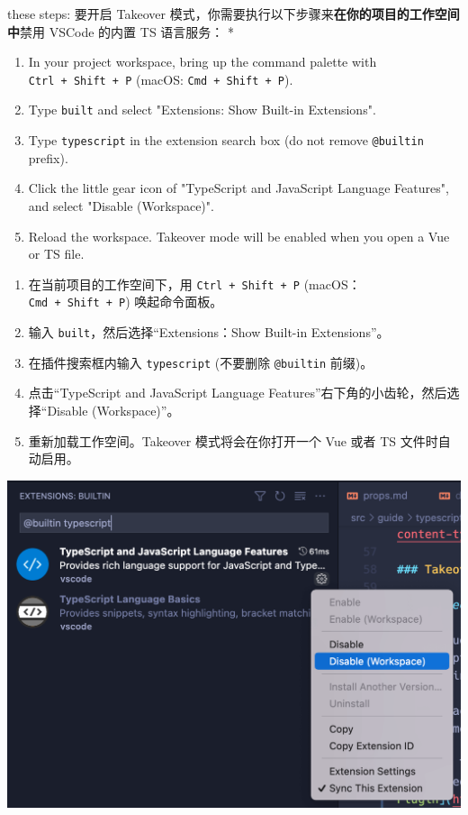 \begin{paracol}{2}
these steps:
\switchcolumn
要开启 Takeover
模式，你需要执行以下步骤来\textbf{在你的项目的工作空间中}禁用 VSCode
的内置 TS 语言服务：
\switchcolumn[0]*%
\begin{enumerate}
\item
  In your project workspace, bring up the command palette with
  \texttt{Ctrl\ +\ Shift\ +\ P} (macOS: \texttt{Cmd\ +\ Shift\ +\ P}).
\item
  Type \texttt{built} and select "Extensions: Show Built-in Extensions".
\item
  Type \texttt{typescript} in the extension search box (do not remove
  \texttt{@builtin} prefix).
\item
  Click the little gear icon of "TypeScript and JavaScript Language
  Features", and select "Disable (Workspace)".
\item
  Reload the workspace. Takeover mode will be enabled when you open a
  Vue or TS file.
\end{enumerate}
\switchcolumn
\begin{enumerate}
\item
  在当前项目的工作空间下，用 \texttt{Ctrl\ +\ Shift\ +\ P}
  (macOS：\texttt{Cmd\ +\ Shift\ +\ P}) 唤起命令面板。
\item
  输入 \texttt{built}，然后选择``Extensions：Show Built-in
  Extensions''。
\item
  在插件搜索框内输入 \texttt{typescript} (不要删除 \texttt{@builtin}
  前缀)。
\item
  点击``TypeScript and JavaScript Language
  Features''右下角的小齿轮，然后选择``Disable (Workspace)''。
\item
  重新加载工作空间。Takeover 模式将会在你打开一个 Vue 或者 TS
  文件时自动启用。
\end{enumerate}
\end{paracol}

\begin{center} 
\includegraphics{./img/takeover-mode.54f7bbf6.png} 
\end{center}


